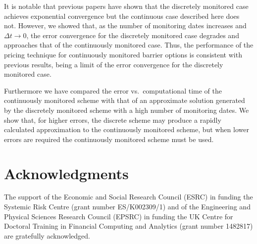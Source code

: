 \documentclass[11pt,a4paper]{article}
\begin{document}
It is notable that previous papers have shown that the discretely monitored case achieves exponential convergence \citep{Fusai2016,Phelan2017} but the continuous case described here does not. However, we showed that, as the number of monitoring dates increases and $\Delta t\rightarrow0$, the error convergence for the discretely monitored case degrades and approaches that of the continuously monitored case. Thus, the performance of the pricing technique for continuously monitored barrier options is consistent with previous results, being a limit of the error convergence for the discretely monitored case.

Furthermore we have compared the error vs.\ computational time of the continuously monitored scheme with that of an approximate solution generated by the discretely monitored scheme with a high number of monitoring dates. We show that, for higher errors, the discrete scheme may produce a rapidly calculated approximation to the continuously monitored scheme, but when lower errors are required the continuously monitored scheme must be used.

\section*{Acknowledgments}
The support of the Economic and Social Research Council (ESRC) in funding the Systemic Risk Centre (grant number ES/K002309/1) and of the Engineering and Physical Sciences Research Council (EPSRC) in funding the UK Centre for Doctoral Training in Financial Computing and Analytics (grant number 1482817) are gratefully acknowledged.



%
\newpage
\end{document}
